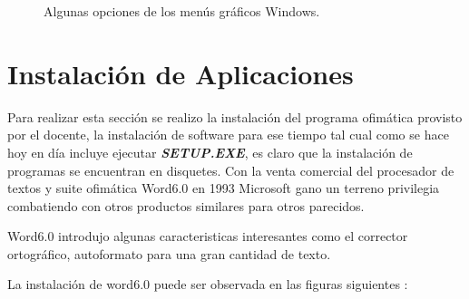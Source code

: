 \documentclass[paper=a4, fontsize=12pt]{article} 		%
\numberwithin{equation}{section}						%
\numberwithin{table}{section} 							%
\begin{document}
\begin{figure}[H]
 	\centering
	\caption{Algunas opciones de los menús gráficos Windows.}
\end{figure}
\section{Instalación de  Aplicaciones}
Para realizar esta sección se realizo la instalación del programa ofimática provisto por el docente, la instalación de software para ese tiempo tal cual como se hace hoy en día incluye ejecutar \textbf{\textit{SETUP.EXE}}, es claro que la instalación de programas se encuentran en  disquetes. Con la venta comercial del procesador de textos y suite ofimática Word6.0 en 1993 Microsoft gano un terreno privilegia combatiendo con otros productos similares para otros parecidos. 


Word6.0 introdujo algunas caracteristicas interesantes como el corrector ortográfico, autoformato para una gran cantidad de texto. 

La instalación  de word6.0 puede ser observada en las figuras siguientes : 
\end{document}

